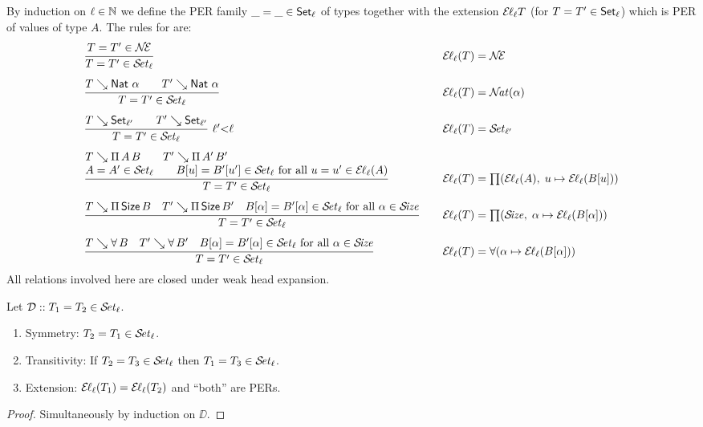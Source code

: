 \documentclass[acmlarge,review,anonymous]{acmart}\settopmatter{printfolios=true}
\begin{document}
By induction on $\ell \in \NN$ we define the PER family
$\_ = \_ \in \Set[\ell]$ of types
together with the extension $\EL[\ell] T$ (for $T = T' \in \Set[\ell]$)
which is PER of values of type $A$.
The rules for  are:
\[
\begin{array}{l@{\qquad}l}
  \ru{%
      T = T' \in \NEE
    }{T = T' \in \SET[\ell]}
  & \EL[\ell](T) = \NEE
\\[3ex]
  \ru{T \evalsto \Nat\,\alpha \qquad T' \evalsto \Nat\,\alpha
    }{T = T' \in \SET[\ell]}
  & \EL[\ell](T) = \NAT(\alpha)
\\[3ex]
  \rux{T \evalsto \Set[\ell'] \qquad T' \evalsto \Set[\ell']
     }{T = T' \in \SET[\ell]
     }{\ell'{<}\ell}
  & \EL[\ell](T) = \SET[\ell']
\\[3ex]
  \rul{T \evalsto \piT A B \qquad
      T' \evalsto \piT{A'}{B'} \\
      A = A' \in \SET[\ell] \qquad
      B[u] = B'[u'] \in \SET[\ell] \mforall u = u' \in \EL[\ell](A)
    }{T = T' \in \SET[\ell]}
  & \EL[\ell](T) = \PI(\EL[\ell](A),\;u \mapsto \EL[\ell](B[u]))
\\[3ex]
  \rul{T \evalsto \piT \Size B \quad
      T' \evalsto \piT{\Size}{B'} \quad
      B[\alpha] = B'[\alpha] \in \SET[\ell] \mforall \alpha \in \SIZE
    }{T = T' \in \SET[\ell]}
  & \EL[\ell](T) = \PI(\SIZE,\; \alpha \mapsto \EL[\ell](B[\alpha]))
\\[3ex]
  \rul{T \evalsto \forallT B \quad
      T' \evalsto \forallT{B'} \quad
      B[\alpha] = B'[\alpha] \in \SET[\ell] \mforall \alpha \in \SIZE
    }{T = T' \in \SET[\ell]}
  & \EL[\ell](T) = \FORALL(\alpha \mapsto \EL[\ell](B[\alpha]))
\end{array}
\]
All relations involved here are closed under weak head expansion.
\begin{lemma}
  Let $\DD :: T_1 = T_2 \in \SET[\ell]$.
  \begin{enumerate}
  \item Symmetry: $T_2 = T_1 \in \SET[\ell]$.
  \item Transitivity: If $T_2 = T_3 \in \SET[\ell]$ then $T_1 = T_3 \in \SET[\ell]$.
  \item Extension: $\EL[\ell](T_1) = \EL[\ell](T_2)$ and ``both'' are PERs.
  \end{enumerate}
\end{lemma}
\begin{proof}
  Simultaneously by induction on $\DD$.
\end{proof}
\end{document}
